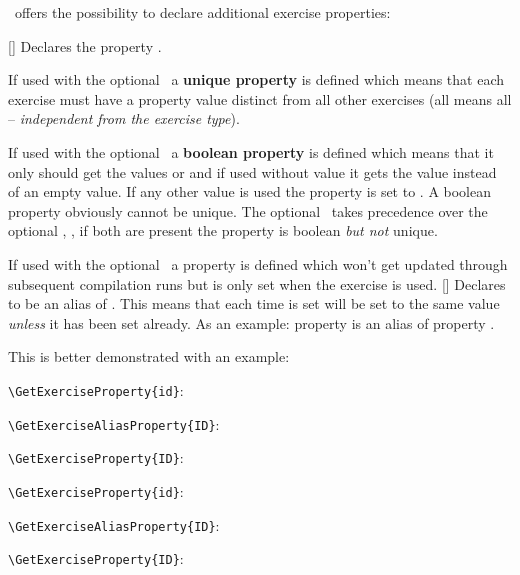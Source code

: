 \documentclass{xsim-manual}
\begin{document}
\xsim\ offers the possibility to declare additional exercise properties:
\begin{commands}
  [\barg\sarg\narg{}]
    Declares the property .
    
    If used with the optional \barg\ a \textbf{unique property} is defined
    which means that each exercise must have a property value distinct from
    all other exercises (all means all -- \emph{independent from the exercise
      type}).

    If used with the optional \sarg\ a \textbf{boolean property} is defined
    which means that it only should get the values  or 
    and if used without value it gets the value  instead of an
    empty value.  If any other value is used the property is set to
    .  A boolean property obviously cannot be unique.  The
    optional \sarg\ takes precedence over the optional \barg, \ie, if both are
    present the property is boolean \emph{but not} unique.

    If used with the optional \narg\ a property is defined which won't get
    updated through subsequent compilation runs but is only set when the
    exercise is used.
  []
    Declares  to be an alias of .  This
    means that each time  is set  will be
    set to the same value \emph{unless} it has been set already.  As an
    example: property  is an alias of property .
\end{commands}

This is better demonstrated with an example:
\begin{example}
  \begin{exercise}
    \lipsum[4]
    \verb+\GetExerciseProperty{id}+:  \par
    \verb+\GetExerciseAliasProperty{ID}+:  \par
    \verb+\GetExerciseProperty{ID}+: 
  \end{exercise}
  \begin{exercise}[ID=foo-bar]
    \lipsum[4]
    \verb+\GetExerciseProperty{id}+:  \par
    \verb+\GetExerciseAliasProperty{ID}+:  \par
    \verb+\GetExerciseProperty{ID}+: 
  \end{exercise}
\end{example}
\end{document}
